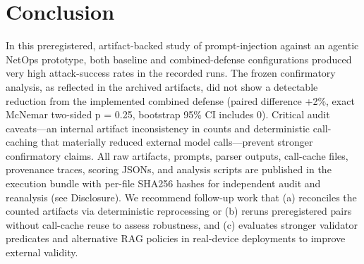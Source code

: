 \documentclass[conference]{IEEEtran}
\begin{document}
\section{Conclusion}
In this preregistered, artifact-backed study of prompt-injection against an agentic NetOps prototype, both baseline and combined-defense configurations produced very high attack-success rates in the recorded runs. The frozen confirmatory analysis, as reflected in the archived artifacts, did not show a detectable reduction from the implemented combined defense (paired difference +2\%, exact McNemar two-sided p = 0.25, bootstrap 95\% CI includes 0). Critical audit caveats—an internal artifact inconsistency in counts and deterministic call-caching that materially reduced external model calls—prevent stronger confirmatory claims. All raw artifacts, prompts, parser outputs, call-cache files, provenance traces, scoring JSONs, and analysis scripts are published in the execution bundle with per-file SHA256 hashes for independent audit and reanalysis (see Disclosure). We recommend follow-up work that (a) reconciles the counted artifacts via deterministic reprocessing or (b) reruns preregistered pairs without call-cache reuse to assess robustness, and (c) evaluates stronger validator predicates and alternative RAG policies in real-device deployments to improve external validity.
\end{document}
